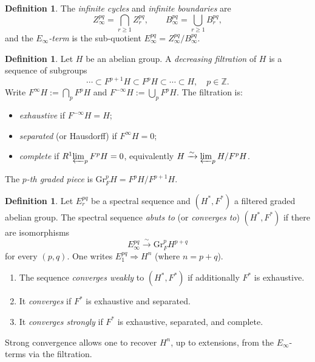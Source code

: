 \documentclass[12pt,a4paper]{article}
\theoremstyle{definition}
\newtheorem{definition}[theorem]{Definition}
\newcommand{\Gr}{\mathrm{Gr}}
\newcommand{\Z}{\mathbb{Z}}
\begin{document}
\begin{definition}\label{def:infinite-terms}
The \emph{infinite cycles} and \emph{infinite boundaries} are
\[
  Z_\infty^{pq} = \bigcap_{r\geq 1} Z_r^{pq},\qquad
  B_\infty^{pq} = \bigcup_{r\geq 1} B_r^{pq},
\]
and the \emph{$E_\infty$-term} is the sub-quotient
$E_\infty^{pq} = Z_\infty^{pq}/B_\infty^{pq}$.
\end{definition}

\begin{definition}\label{def:filtration}
Let $H$ be an abelian group.  A \emph{decreasing filtration} of $H$ is a sequence
of subgroups
\[
  \cdots\subset F^{p+1}H\subset F^pH\subset\cdots\subset H,\quad p\in\Z.
\]
Write $F^\infty H:=\bigcap_p F^pH$ and $F^{-\infty}H:=\bigcup_p F^pH$.
The filtration is:
\begin{itemize}
  \item \emph{exhaustive} if $F^{-\infty}H=H$;
  \item \emph{separated} (or Hausdorff) if $F^\infty H=0$;
  \item \emph{complete} if $R^1\!\varprojlim_p F^pH=0$, equivalently
    $H\xrightarrow{\sim}\varprojlim_p H/F^pH$.
\end{itemize}
The \emph{$p$-th graded piece} is $\Gr_F^p H = F^pH/F^{p+1}H$.
\end{definition}

\begin{definition}\label{def:convergence}
Let $E_r^{pq}$ be a spectral sequence and $(H^*,F^*)$ a filtered graded abelian
group.  The spectral sequence \emph{abuts to} (or \emph{converges to})
$(H^*,F^*)$ if there are isomorphisms
\[
  E_\infty^{pq} \xrightarrow{\;\sim\;} \Gr_F^p H^{p+q}
\]
for every $(p,q)$.  One writes $E_1^{pq}\Rightarrow H^n$ (where $n=p+q$).
\begin{enumerate}[label=\textup{(\roman*)}]
  \item The sequence \emph{converges weakly} to $(H^*,F^*)$ if additionally $F^*$
    is exhaustive.
  \item It \emph{converges} if $F^*$ is exhaustive and separated.
  \item It \emph{converges strongly} if $F^*$ is exhaustive, separated, and
    complete.
\end{enumerate}
Strong convergence allows one to recover $H^n$, up to extensions, from the
$E_\infty$-terms via the filtration.
\end{definition}
\end{document}
